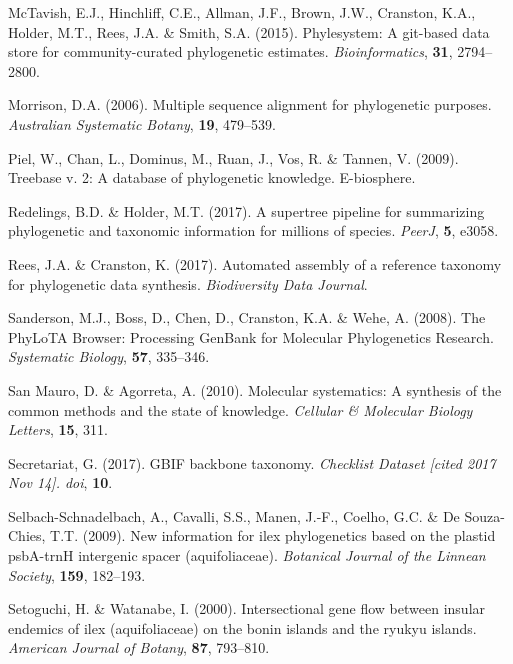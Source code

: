 \documentclass[]{article}
\begin{document}
\leavevmode\hypertarget{ref-mctavish2015phylesystem}{}%
McTavish, E.J., Hinchliff, C.E., Allman, J.F., Brown, J.W., Cranston, K.A., Holder, M.T., Rees, J.A. \& Smith, S.A. (2015). Phylesystem: A git-based data store for community-curated phylogenetic estimates. \emph{Bioinformatics}, \textbf{31}, 2794--2800.

\leavevmode\hypertarget{ref-morrison2006multiple}{}%
Morrison, D.A. (2006). Multiple sequence alignment for phylogenetic purposes. \emph{Australian Systematic Botany}, \textbf{19}, 479--539.

\leavevmode\hypertarget{ref-piel2009treebase}{}%
Piel, W., Chan, L., Dominus, M., Ruan, J., Vos, R. \& Tannen, V. (2009). Treebase v. 2: A database of phylogenetic knowledge. E-biosphere.

\leavevmode\hypertarget{ref-redelings2017supertree}{}%
Redelings, B.D. \& Holder, M.T. (2017). A supertree pipeline for summarizing phylogenetic and taxonomic information for millions of species. \emph{PeerJ}, \textbf{5}, e3058.

\leavevmode\hypertarget{ref-rees2017automated}{}%
Rees, J.A. \& Cranston, K. (2017). Automated assembly of a reference taxonomy for phylogenetic data synthesis. \emph{Biodiversity Data Journal}.

\leavevmode\hypertarget{ref-sanderson2008phylota}{}%
Sanderson, M.J., Boss, D., Chen, D., Cranston, K.A. \& Wehe, A. (2008). The PhyLoTA Browser: Processing GenBank for Molecular Phylogenetics Research. \emph{Systematic Biology}, \textbf{57}, 335--346.

\leavevmode\hypertarget{ref-san2010molecular}{}%
San Mauro, D. \& Agorreta, A. (2010). Molecular systematics: A synthesis of the common methods and the state of knowledge. \emph{Cellular \& Molecular Biology Letters}, \textbf{15}, 311.

\leavevmode\hypertarget{ref-secretariat2017gbif}{}%
Secretariat, G. (2017). GBIF backbone taxonomy. \emph{Checklist Dataset {[}cited 2017 Nov 14{]}. doi}, \textbf{10}.

\leavevmode\hypertarget{ref-selbach2009new}{}%
Selbach-Schnadelbach, A., Cavalli, S.S., Manen, J.-F., Coelho, G.C. \& De Souza-Chies, T.T. (2009). New information for ilex phylogenetics based on the plastid psbA-trnH intergenic spacer (aquifoliaceae). \emph{Botanical Journal of the Linnean Society}, \textbf{159}, 182--193.

\leavevmode\hypertarget{ref-setoguchi2000intersectional}{}%
Setoguchi, H. \& Watanabe, I. (2000). Intersectional gene flow between insular endemics of ilex (aquifoliaceae) on the bonin islands and the ryukyu islands. \emph{American Journal of Botany}, \textbf{87}, 793--810.
\end{document}
